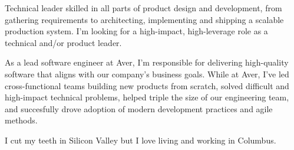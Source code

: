 

\begin{cvparagraph}

Technical leader skilled in all parts of product design and development, from gathering requirements to architecting, implementing and shipping a scalable production system.
I'm looking for a high-impact, high-leverage role as a technical and/or product leader.

As a lead software engineer at Aver, I'm responsible for delivering high-quality software that aligns with our company's business goals.
While at Aver, I've led cross-functional teams building new products from scratch, solved difficult and high-impact technical problems, helped triple the size of our engineering team, and succesfully drove adoption of modern development practices and agile methods.

I cut my teeth in Silicon Valley but I love living and working in Columbus.

\end{cvparagraph}
